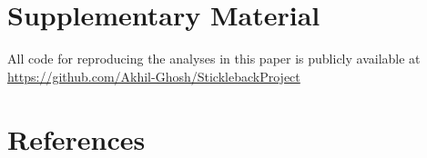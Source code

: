 \documentclass[
  12pt,
]{article}
\begin{document}
\hypertarget{supplementary-material}{%
\section*{Supplementary Material}\label{supplementary-material}}

All code for reproducing the analyses in this paper is publicly
available at \url{https://github.com/Akhil-Ghosh/SticklebackProject}

\hypertarget{references}{%
\section*{References}\label{references}}

\hypertarget{refs}{}
\end{document}
